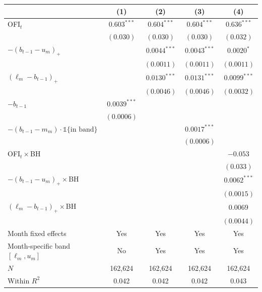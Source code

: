 \begin{tabular}{lcccc}
\toprule
 & (1) & (2) & (3) & (4) \\
\midrule
OFI$_t$ & $0.603^{***}$ & $0.604^{***}$ & $0.604^{***}$ & $0.636^{***}$ \\
 & $(0.030)$ & $(0.030)$ & $(0.030)$ & $(0.032)$ \\
$-(b_{t-1}-u_m)_+$ \;[$\kappa^+$] &  & $0.0044^{***}$ & $0.0043^{***}$ & $0.0020^{*}$ \\
 &  & $(0.0011)$ & $(0.0011)$ & $(0.0011)$ \\
$(\ell_m-b_{t-1})_+$ \;[$\kappa^-$] &  & $0.0130^{***}$ & $0.0131^{***}$ & $0.0099^{***}$ \\
 &  & $(0.0046)$ & $(0.0046)$ & $(0.0032)$ \\
$-b_{t-1}$  & $0.0039^{***}$ &  &  &  \\
 & $(0.0006)$ &  &  &  \\
$-(b_{t-1}-m_m)\cdot\mathbb 1\{\text{in band}\}$ &  &  & $0.0017^{***}$ &  \\
 &  &  & $(0.0006)$ &  \\
OFI$_t\times$BH &  &  &  & $-0.053$ \\
 &  &  &  & $(0.033)$ \\
$-(b_{t-1}-u_m)_+\times$BH &  &  &  & $0.0062^{***}$ \\
 &  &  &  & $(0.0015)$ \\
$(\ell_m-b_{t-1})_+\times$BH &  &  &  & $0.0069$ \\
 &  &  &  & $(0.0044)$ \\
\midrule
Month fixed effects & Yes & Yes & Yes & Yes \\
Month-specific band $[\ell_m,u_m]$ & No & Yes & Yes & Yes \\
$N$ & 162,624 & 162,624 & 162,624 & 162,624 \\
Within $R^2$ & 0.042 & 0.042 & 0.042 & 0.043 \\
\bottomrule
\end{tabular}
